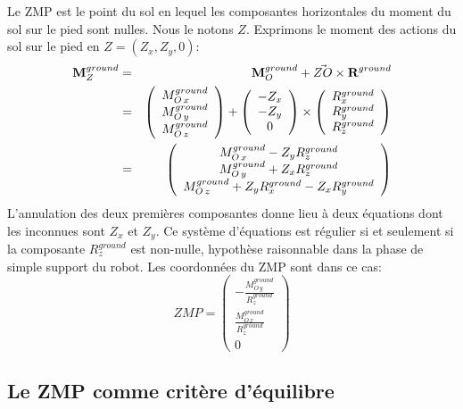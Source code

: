 Le ZMP est le point du sol en lequel les composantes horizontales du
moment du sol sur le pied sont nulles. Nous le notons $Z$. Exprimons
le moment des actions du sol sur le pied en $Z=(Z_x,Z_y,0)$:
\begin{eqnarray*}
\textbf{M}_Z^{ground} &=& \textbf{M}_O^{ground} + \vec{ZO}\times
\textbf{R}^{ground} \\
&=& \left(\begin{array}{c} M^{ground}_{O\,x} \\ M^{ground}_{O\,y} \\ M^{ground}_{O\,z}
\end{array}\right)
+
\left(\begin{array}{c} -Z_x \\ -Z_y \\ 0
\end{array}\right)
\times
\left(\begin{array}{c} R^{ground}_x \\ R^{ground}_y \\ R^{ground}_z
\end{array}\right) \\
&=&
\left(\begin{array}{c}
M^{ground}_{O\,x} - Z_y R^{ground}_z\\
M^{ground}_{O\,y} + Z_x R^{ground}_z \\
M^{ground}_{O\,z} + Z_y R^{ground}_x - Z_x R^{ground}_y
\end{array}\right)
\end{eqnarray*}
L'annulation des deux premières composantes donne lieu à deux
équations dont les inconnues sont $Z_x$ et $Z_y$. Ce système
d'équations est régulier si et seulement si la composante $R^{ground}_z$
est non-nulle, hypothèse raisonnable dans la phase de simple support
du robot. Les coordonnées du ZMP sont dans ce cas:
$$
ZMP =
\left(\begin{array}{c}
-\frac{M^{ground}_{O\,y}}{R^{ground}_z} \\
\frac{M^{ground}_{O\,x}}{R^{ground}_z} \\
0
\end{array}\right)
$$
\subsection{Le ZMP comme critère d'équilibre}

